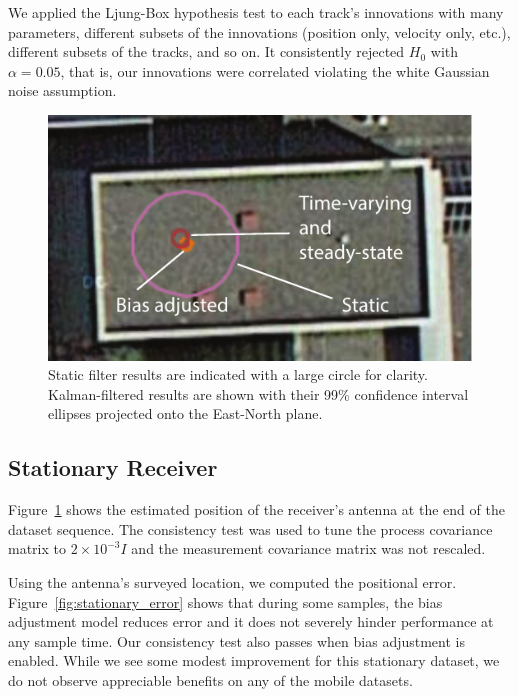 We applied the Ljung-Box hypothesis test to each track's innovations with many parameters, different subsets of the innovations (position only, velocity only, etc.), different subsets of the tracks, and so on.  It consistently rejected $H_0$ with $\alpha = 0.05$, that is, our innovations were correlated violating the white Gaussian noise assumption.

\begin{figure}
\includegraphics[width=\columnwidth]{stationary_map}
\caption{Static filter results are indicated with a large circle for clarity.  Kalman-filtered results are shown with their 99\% confidence interval ellipses projected onto the East-North plane.}
\label{fig:stationary_map} 
\end{figure}


\subsection{Stationary Receiver}
Figure~\ref{fig:stationary_map} shows the estimated position of the receiver's antenna at the end of the dataset sequence.  The consistency test was used to tune the process covariance matrix to $2\times10^{-3}I$ and the measurement covariance matrix was not rescaled.

Using the antenna's surveyed location, we computed the positional error.  Figure~\ref{fig:stationary_error} shows that during some samples, the bias adjustment model reduces error and it does not severely hinder performance at any sample time.  Our consistency test also passes when bias adjustment is enabled.  While we see some modest improvement for this stationary dataset, we do not observe appreciable benefits on any of the mobile datasets.

